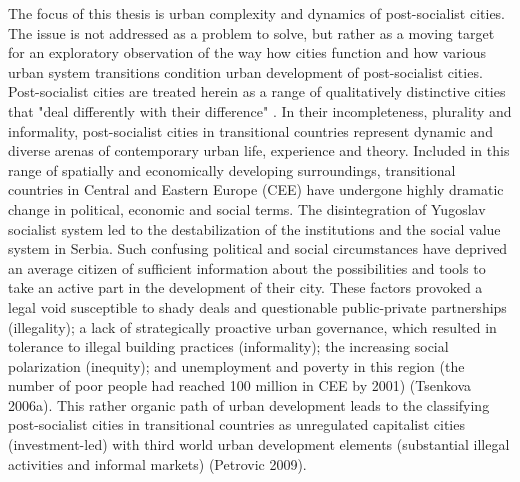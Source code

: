 \documentclass[11pt]{report}
\begin{document}
The focus of this thesis is urban complexity and dynamics of post-socialist cities. The issue is not addressed as a problem to solve, but rather as a moving target for an exploratory observation of the way how cities function and how various urban system transitions condition urban development of post-socialist cities.
\\
Post-socialist cities are treated herein as a range of qualitatively distinctive cities that "deal differently with their difference" \href{ref}{\citealt{ref}}. In their incompleteness, plurality and informality, post-socialist cities in transitional countries represent dynamic and diverse arenas of contemporary urban life, experience and theory. Included in this range of spatially and economically developing surroundings, transitional countries in Central and Eastern Europe (CEE) have undergone highly dramatic change in political, economic and social terms. The disintegration of Yugoslav socialist system led to the destabilization of the institutions and the social value system in Serbia. Such confusing political and social circumstances have deprived an average citizen of sufficient information about the possibilities and tools to take an active part in the development of their city. These factors provoked a legal void susceptible to shady deals and questionable public-private partnerships (illegality); a lack of strategically proactive urban governance, which resulted in tolerance to illegal building practices (informality); the increasing social polarization (inequity); and unemployment and poverty in this region (the number of poor people had reached 100 million in CEE by 2001) (Tsenkova 2006a). This rather organic path of urban development leads to the classifying post-socialist cities in transitional countries as unregulated capitalist cities (investment-led) with third world urban development elements (substantial illegal activities and informal markets) (Petrovic 2009).
\\
\end{document}
